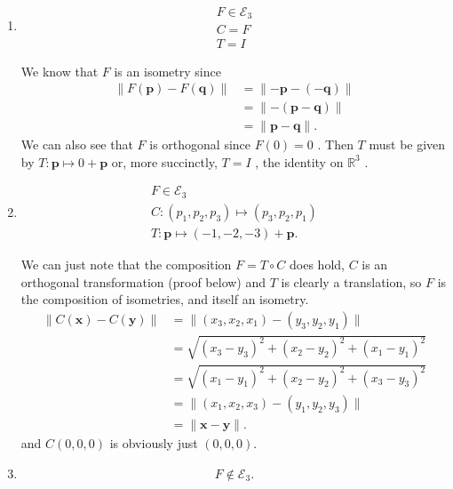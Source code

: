 \documentclass[12 pt, letterpaper]{hmcpset}
\begin{document}
\begin{solution}
	\begin{enumerate}
		\item 
			\[
				\boxed{
					\begin{gathered}
						F \in \mathcal{E}_{3} \\
						C = F \\
						T = I
					\end{gathered}
				}
			\] 

			We know that $F$  is an isometry since
			\[
				\begin{split}
					\lVert F(\mathbf{p}) - F(\mathbf{q}) \rVert & = \lVert -\mathbf{p} - (-\mathbf{q}) \rVert \\
										    & = \lVert -(\mathbf{p} - \mathbf{q}) \rVert \\
										    & = \lVert \mathbf{p} - \mathbf{q} \rVert.
				\end{split}
			\]
			We can also see that $F$  is orthogonal since $F(0) = 0$ . Then $T$  must be given by $T : \mathbf{p} \mapsto 0 + \mathbf{p}$ or, more succinctly, $T = I$ , the identity on $\mathbb{R}^{3}$ .
		\item
			\[
				\boxed{
					\begin{gathered}
						F \in \mathcal{E}_{3} \\
						C : (p_{1}, p_{2}, p_{3}) \mapsto (p_{3}, p_{2}, p_{1}) \\
						T : \mathbf{p} \mapsto (-1, -2, -3) + \mathbf{p}.
					\end{gathered}
				}
			\] 

			We can just note that the composition $F = T \circ C$ does hold, $C$ is an orthogonal transformation (proof below) and $T$ is clearly a translation, so $F$ is the composition of isometries, and itself an isometry.
			\[
				\begin{split}
					\lVert C(\mathbf{x}) - C(\mathbf{y}) \rVert & = \lVert (x_{3}, x_{2}, x_{1}) - (y_{3}, y_{2}, y_{1}) \rVert \\
										    & = \sqrt{(x_{3} - y_{3})^{2} + (x_{2} - y_{2})^{2} + (x_{1} - y_{1})^{2}} \\
										    & = \sqrt{(x_{1} - y_{1})^{2} + (x_{2} - y_{2})^{2} + (x_{3} - y_{3})^{2}} \\
										    & = \lVert (x_{1}, x_{2}, x_{3}) - (y_{1}, y_{2}, y_{3}) \rVert \\
										    & = \lVert \mathbf{x} - \mathbf{y} \rVert.
				\end{split}
			\]
			and $C(0, 0, 0)$ is obviously just $(0, 0, 0)$.
		\item
			\[
				\boxed{
					F \notin \mathcal{E}_{3}.
				}
			\] 


\end{enumerate}
\end{solution}
\end{document}
